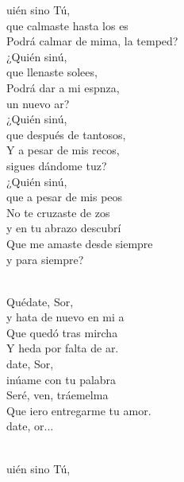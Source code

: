 \documentclass[12pt]{article}
\begin{document}
\begin{multicols*}{2}
\begin{cancion}%
	uién sino Tú,\\
	que calmaste hasta los es\\
	Podrá calmar de mima, la temped?\\
	¿Quién sinú, \\
	que llenaste solees,\\
	Podrá dar a mi espnza, \\
	un nuevo ar?\\
	¿Quién sinú, \\
	que después de tantosos, \\
	Y a pesar de mis recos,\\
	sigues dándome tuz?\\
	¿Quién sinú, \\
	que a pesar de mis peos\\
	No te cruzaste de zos\\
y en tu abrazo descubrí\\
Que me amaste desde siempre \\
y para siempre?\\\jump\\
	\begin{chorus}%
	Quédate, Sor,\\
	y hata de nuevo en mi a\\
	Que  quedó tras mircha\\
	Y heda por falta de ar.\\
	date, Sor, \\
	inúame con tu palabra\\
	Seré, ven, tráemelma \\
	Que iero entregarme tu amor.\\
	date, or...          \\
	\end{chorus}%
	\jump\\
	uién sino Tú,\\

\end{cancion}
\end{multicols*}
\end{document}
